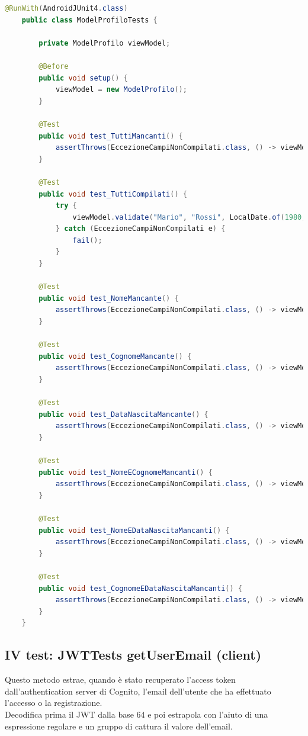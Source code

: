             \begin{lstlisting}[language=Java, caption=ModelProfiloTests.java]
    @RunWith(AndroidJUnit4.class)
    public class ModelProfiloTests {
    
        private ModelProfilo viewModel;
    
        @Before
        public void setup() {
            viewModel = new ModelProfilo();
        }
    
        @Test
        public void test_TuttiMancanti() {
            assertThrows(EccezioneCampiNonCompilati.class, () -> viewModel.validate("", "", LocalDate.MIN));
        }
    
        @Test
        public void test_TuttiCompilati() {
            try {
                viewModel.validate("Mario", "Rossi", LocalDate.of(1980, 6, 5));
            } catch (EccezioneCampiNonCompilati e) {
                fail();
            }
        }
    
        @Test
        public void test_NomeMancante() {
            assertThrows(EccezioneCampiNonCompilati.class, () -> viewModel.validate("", "Rossi", LocalDate.of(1980, 6, 5)));
        }
    
        @Test
        public void test_CognomeMancante() {
            assertThrows(EccezioneCampiNonCompilati.class, () -> viewModel.validate("Mario", "", LocalDate.of(1980, 6, 5)));
        }
    
        @Test
        public void test_DataNascitaMancante() {
            assertThrows(EccezioneCampiNonCompilati.class, () -> viewModel.validate("Mario", "Rossi", LocalDate.MIN));
        }
    
        @Test
        public void test_NomeECognomeMancanti() {
            assertThrows(EccezioneCampiNonCompilati.class, () -> viewModel.validate("", "", LocalDate.of(1980, 6, 5)));
        }
    
        @Test
        public void test_NomeEDataNascitaMancanti() {
            assertThrows(EccezioneCampiNonCompilati.class, () -> viewModel.validate("", "Rossi", LocalDate.MIN));
        }
    
        @Test
        public void test_CognomeEDataNascitaMancanti() {
            assertThrows(EccezioneCampiNonCompilati.class, () -> viewModel.validate("Mario", "", LocalDate.MIN));
        }
    }
            \end{lstlisting}
            
        \subsection{IV test: JWTTests getUserEmail (client)}
            Questo metodo estrae, quando è stato recuperato l'access token dall'authentication server di Cognito, l'email dell'utente che ha effettuato l'accesso o la registrazione. \\
            Decodifica prima il JWT dalla base 64 e poi estrapola con l'aiuto di una espressione regolare e un gruppo di cattura il valore dell'email. \\


